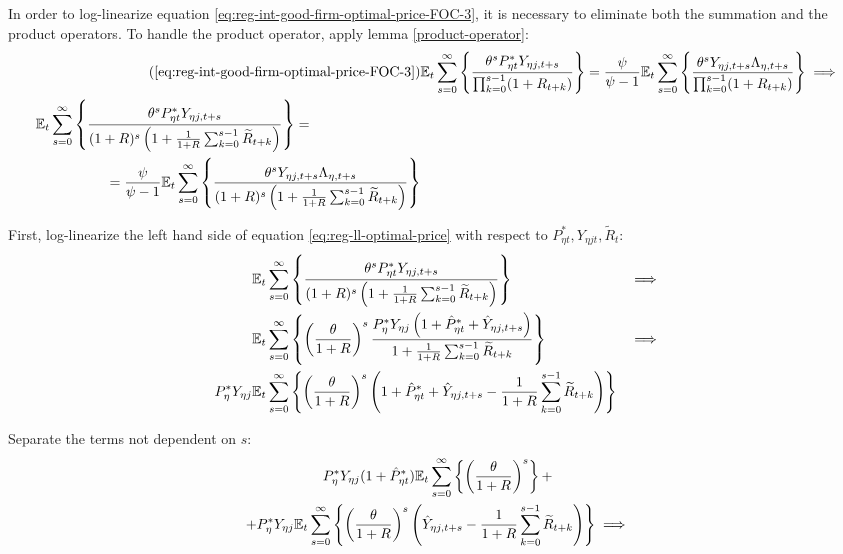\documentclass[../thesis.tex]{subfiles}
\begin{document}
In order to log-linearize equation \ref{eq:reg-int-good-firm-optimal-price-FOC-3}, it is necessary to eliminate both the summation and the product operators. To handle the product operator, apply lemma \ref{product-operator}:
\begin{align}
	\tag{\ref{eq:reg-int-good-firm-optimal-price-FOC-3}}
	& \E \sum_{s=0}^{\infty} \left\{ \frac{\theta^s P_{\eta t}^{\ast} Y_{\eta j,t+s}}{ \prod_{k=0}^{s-1}(1+R_{t+k})} \right\} = \frac{\psi}{\psi-1} \E \sum_{s=0}^{\infty} \left\{ \frac{\theta^s Y_{\eta j,t+s} \Lambda_{\eta, t+s}}{\prod_{k=0}^{s-1}(1+R_{t+k})} \right\} \implies
	\\
	\begin{split}
		& \E \sum_{s=0}^{\infty} \left\{ \frac{\theta^s P_{\eta t}^{\ast} Y_{\eta j,t+s}}{ (1 + R)^s \left( 1 + \frac{1}{1 + R} \sum_{k=0}^{s-1} \widetilde{R}_{t+k} \right)} \right\} = 
		\\ & \quad \quad \quad \quad \quad = \frac{\psi}{\psi-1} \E \sum_{s=0}^{\infty} \left\{ \frac{\theta^s Y_{\eta j,t+s} \Lambda_{\eta, t+s}}{ (1 + R)^s \left( 1 + \frac{1}{1 + R} \sum_{k=0}^{s-1} \widetilde{R}_{t+k} \right)} \right\} \label{eq:reg-ll-optimal-price}
	\end{split}
\end{align}

First, log-linearize the left hand side of equation \ref{eq:reg-ll-optimal-price} with respect to \( P_{\eta t}^{\ast}, Y_{\eta j t}, \widetilde{R}_t \):
\begin{alignat}{2}
	& {\mathbb{E}_{t}} \sum_{s=0}^{\infty} \left\{ \frac{\theta^s P_{\eta t}^{\ast} Y_{\eta j,t+s}}{ (1 + R)^s \left( 1 + \frac{1}{1 + R} \sum_{k=0}^{s-1} \widetilde{R}_{t+k} \right)} \right\} &\implies \nonumber \\
	& {\mathbb{E}_{t}} \sum_{s=0}^{\infty} \left\{ \left( \frac{\theta}{1 + R} \right)^s  \frac{ P_{\eta}^{\ast} Y_{\eta j} \left( 1 + \hat{P}_{\eta t}^{\ast} + \hat{Y}_{\eta j, t+s} \right)}{ 1 + \frac{1}{1 + R} \sum_{k=0}^{s-1} \widetilde{R}_{t+k}} \right\} &\implies \nonumber \\
	P_{\eta}^{\ast} Y_{\eta j} &{\mathbb{E}_{t}} \sum_{s=0}^{\infty} \left\{ \left( \frac{\theta}{1 + R} \right)^s \left( 1 + \hat{P}_{\eta t}^{\ast} + \hat{Y}_{\eta j, t+s} - \frac{1}{1 + R} \sum_{k=0}^{s-1} \widetilde{R}_{t+k} \right) \right\} & \nonumber
\end{alignat}

Separate the terms not dependent on $s$:
\begin{multline}
	P_{\eta}^{\ast} Y_{\eta j} ( 1 + \hat{P}_{\eta t}^{\ast} ) {\mathbb{E}_{t}} \sum_{s=0}^{\infty} \left\{ \left( \frac{\theta}{1 + R} \right)^s \right\} + \\
	+ P_{\eta}^{\ast} Y_{\eta j} {\mathbb{E}_{t}} \sum_{s=0}^{\infty} \left\{ \left( \frac{\theta}{1 + R} \right)^s \left( \hat{Y}_{\eta j, t+s} - \frac{1}{1 + R} \sum_{k=0}^{s-1} \widetilde{R}_{t+k} \right) \right\} \implies \nonumber
\end{multline}
\end{document}
